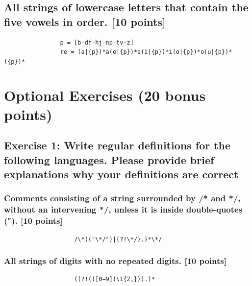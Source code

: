 \documentclass{article}
\begin{document}
        \subsection{All strings of lowercase letters that contain the five vowels in order. [10 points]}
            \begin{lstlisting}
                p = [b-df-hj-np-tv−z]
                re = (a|{p})*a(e|{p})*e(i|{p})*i(o|{p})*o(u|{p})*({p})*
            \end{lstlisting}
    \section{Optional Exercises (20 bonus points)}
        \subsection{Exercise 1: Write regular definitions for the following languages. Please provide brief
        explanations why your definitions are correct}
            \subsubsection{Comments consisting of a string surrounded by /* and */, without an intervening */, unless it is
            inside double-quotes ("). [10 points]}
                \begin{lstlisting}
                    /\*(("\*/")|(?!\*/).)*\*/
                \end{lstlisting}
            \subsubsection{All strings of digits with no repeated digits. [10 points]}
                \begin{lstlisting}
                    ((?!(([0−9])\1{2,})).)*
                \end{lstlisting}
\end{document}
